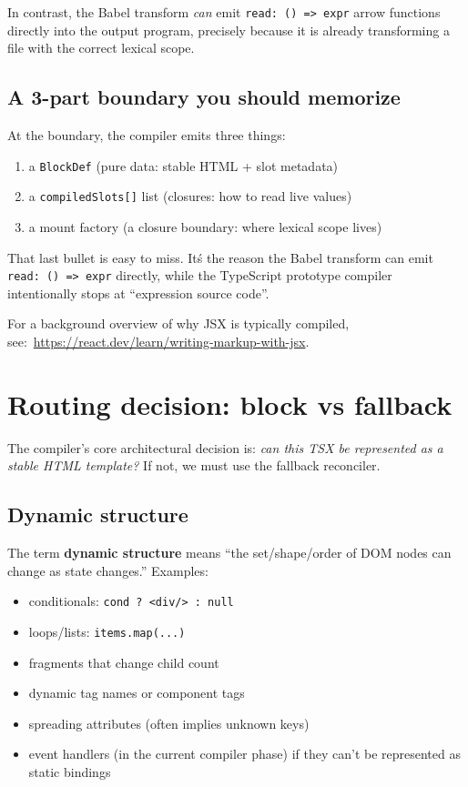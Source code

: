 In contrast, the Babel transform \emph{can} emit \texttt{read: () => expr} arrow functions directly into the output program, precisely because it is already transforming a file with the correct lexical scope.

\subsection{A 3-part boundary you should memorize}

At the boundary, the compiler emits three things:

\begin{enumerate}
\item a \texttt{BlockDef} (pure data: stable HTML + slot metadata)
\item a \texttt{compiledSlots[]} list (closures: how to read live values)
\item a mount factory (a closure boundary: where lexical scope lives)
\end{enumerate}

That last bullet is easy to miss.
It\'s the reason the Babel transform can emit \texttt{read: () => expr} directly, while the TypeScript prototype compiler intentionally stops at ``expression source code''.

For a background overview of why JSX is typically compiled, see:\
\href{https://react.dev/learn/writing-markup-with-jsx}{https://react.dev/learn/writing-markup-with-jsx}.

\section{Routing decision: block vs fallback}

The compiler's core architectural decision is: \emph{can this TSX be represented as a stable HTML template?}
If not, we must use the fallback reconciler.

\subsection{Dynamic structure}

The term \textbf{dynamic structure} means ``the set/shape/order of DOM nodes can change as state changes.''
Examples:

\begin{itemize}
\item conditionals: \texttt{cond ? <div/> : null}
\item loops/lists: \texttt{items.map(...)}
\item fragments that change child count
\item dynamic tag names or component tags
\item spreading attributes (often implies unknown keys)
\item event handlers (in the current compiler phase) if they can't be represented as static bindings
\end{itemize}

